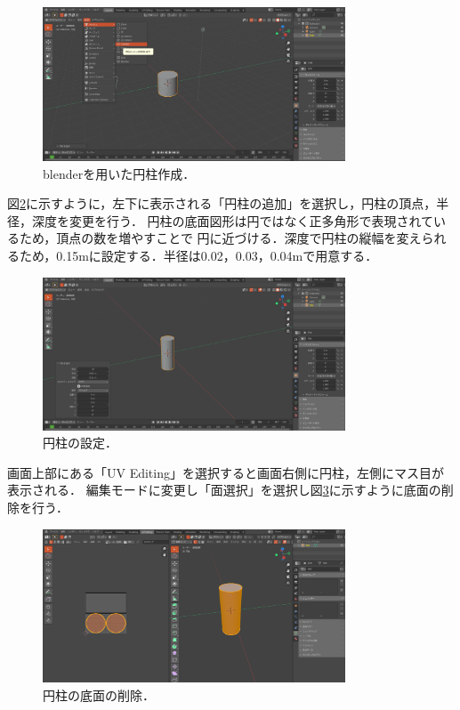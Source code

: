       \begin{figure}[htbp]
      \begin{center}
      \includegraphics[width=90mm]{figure/eps/bl1.eps}
      \caption{blenderを用いた円柱作成．}
      \label{bl1}
      \end{center}
      \end{figure}




図\ref{bl2}に示すように，左下に表示される「円柱の追加」を選択し，円柱の頂点，半径，深度を変更を行う．
円柱の底面図形は円ではなく正多角形で表現されているため，頂点の数を増やすことで
円に近づける．深度で円柱の縦幅を変えられるため，0.15mに設定する．半径は0.02，0.03，0.04mで用意する．

      \begin{figure}[htbp]
      \begin{center}
      \includegraphics[width=90mm]{figure/eps/bl2.eps}
      \caption{円柱の設定．}
      \label{bl2}
      \end{center}
      \end{figure}

\newpage

画面上部にある「UV Editing」を選択すると画面右側に円柱，左側にマス目が表示される．
編集モードに変更し「面選択」を選択し図\ref{bl3}に示すように底面の削除を行う．

      \begin{figure}[htbp]
      \begin{center}
      \includegraphics[width=90mm]{figure/eps/bl3.eps}
      \caption{円柱の底面の削除．}
      \label{bl3}
      \end{center}
      \end{figure}




